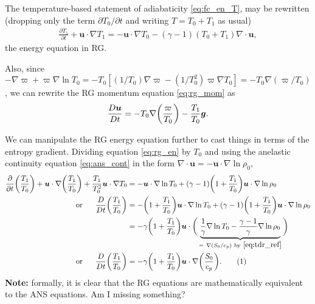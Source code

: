\documentclass[12pt]{article} %
\newcommand{\pderiv}[2]{\frac{\partial#1}{\partial#2}}
\newcommand\numberthis{\addtocounter{equation}{1}\tag{\theequation}}
\newcommand{\pomega}{\varpi}
\begin{document}
	The temperature-based statement of adiabaticity \eqref{eq:fc_en_T}, may be rewritten (dropping only the term $\partial T_0/\partial t$ and writing $T=T_0+T_1$ as usual)
	\begin{align}\label{eq:rg_en}
	\pderiv{T_1}{t} + \bm{u}\cdot \nabla T_1 = -\bm{u}\cdot\nabla T_0 - (\gamma - 1)(T_0+T_1)\nabla\cdot\bm{u},
	\end{align}
	the energy equation in RG. 
	
	Also, since $-\nabla\pomega +\pomega\nabla\ln T_0 = -T_0[(1/T_0)\nabla\pomega - (1/T_0^2)\pomega\nabla T_0] = -T_0\nabla(\pomega/T_0)$, we can rewrite the RG momentum equation \eqref{eq:rg_mom} as
	\begin{align}
	\frac{D\bm{u}}{Dt} = -T_0\nabla\bigg{(}\frac{\pomega}{T_0}\bigg{)} - \frac{T_1}{T_0}\bm{g}.\label{eq:rg_mom2}
	\end{align}
	
	We can manipulate the RG energy equation further to cast things in terms of the entropy gradient. Dividing equation \eqref{eq:rg_en} by $T_0$ and using the anelastic continuity equation \eqref{eq:ans_cont} in the form $\nabla\cdot\bm{u}=-\bm{u}\cdot\nabla\ln \rho_0$,
	\begin{align*}
	\pderiv{}{t}\bigg{(}\frac{T_1}{T_0}\bigg{)}+\bm{u}\cdot\nabla\bigg{(}\frac{T_1}{T_0}\bigg{)} + \frac{T_1}{T_0^2}\bm{u}\cdot\nabla T_0 &= -\bm{u}\cdot\nabla\ln T_0 + (\gamma - 1)\bigg{(}1 + \frac{T_1}{T_0}\bigg{)}\bm{u}\cdot\nabla\ln \rho_0\\
	\text{or}\ \ \ \ \ \frac{D}{Dt}\bigg{(}\frac{T_1}{T_0}\bigg{)} &= -\bigg{(}1 + \frac{T_1}{T_0}\bigg{)}\bm{u}\cdot\nabla\ln T_0 + (\gamma - 1)\bigg{(}1 + \frac{T_1}{T_0}\bigg{)}\bm{u}\cdot\nabla\ln \rho_0\\
	&= - \gamma \bigg{(}1 + \frac{T_1}{T_0}\bigg{)}\bm{u}\cdot\bigg{(}\underbrace{\frac{1}{\gamma}\nabla\ln T_0 - \frac{\gamma - 1}{\gamma}\nabla\ln \rho_0}_{=\ \nabla(S_0/c_p)\ \text{by}\ \eqref{eq:tdr_ref}}\bigg{)}\\
	\text{or}\ \ \ \ \ \frac{D}{Dt}\bigg{(}\frac{T_1}{T_0}\bigg{)} &=  - \gamma \bigg{(}1 + \frac{T_1}{T_0}\bigg{)}\bm{u}\cdot\nabla\bigg{(}\frac{S_0}{c_p}\bigg{)}.\numberthis\label{eq:rg_en2}
	\end{align*}
	\textbf{Note:} formally, it is clear that the RG equations are mathematically equivalent to the ANS equations. Am I missing something?
\end{document}
